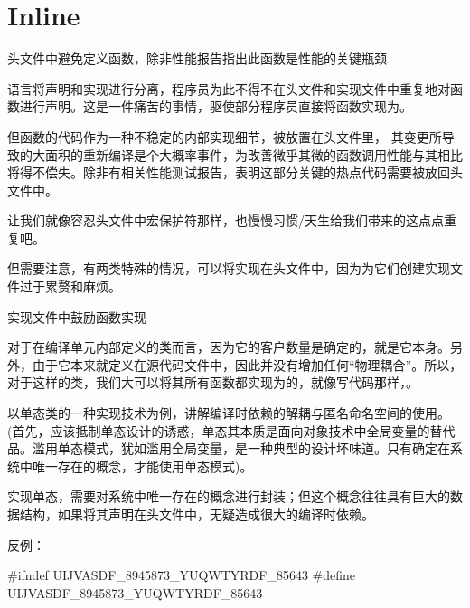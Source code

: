 \section{Inline}

\begin{content}

\begin{regulation}
头文件中避免定义函数，除非性能报告指出此函数是性能的关键瓶颈
\end{regulation}

\cpp{}语言将声明和实现进行分离，程序员为此不得不在头文件和实现文件中重复地对函数进行声明。这是一件痛苦的事情，驱使部分程序员直接将函数实现为。

但函数的代码作为一种不稳定的内部实现细节，被放置在头文件里，
其变更所导致的大面积的重新编译是个大概率事件，为改善微乎其微的函数调用性能与其相比将得不偿失。除非有相关性能测试报告，表明这部分关键的热点代码需要被放回头文件中。

让我们就像容忍头文件中宏保护符那样，也慢慢习惯\clang{}/\cpp{}天生给我们带来的这点点重复吧。

但需要注意，有两类特殊的情况，可以将实现在头文件中，因为为它们创建实现文件过于累赘和麻烦。

\begin{enum}
\end{enum}

\begin{regulation}
实现文件中鼓励函数实现
\end{regulation}

对于在编译单元内部定义的类而言，因为它的客户数量是确定的，就是它本身。另外，由于它本来就定义在源代码文件中，因此并没有增加任何“物理耦合”。所以，对于这样的类，我们大可以将其所有函数都实现为的，就像写代码那样，。

以单态类的一种实现技术为例，讲解编译时依赖的解耦与匿名命名空间的使用。(首先，应该抵制单态设计的诱惑，单态其本质是面向对象技术中全局变量的替代品。滥用单态模式，犹如滥用全局变量，是一种典型的设计坏味道。只有确定在系统中唯一存在的概念，才能使用单态模式)。

实现单态，需要对系统中唯一存在的概念进行封装；但这个概念往往具有巨大的数据结构，如果将其声明在头文件中，无疑造成很大的编译时依赖。

反例：
\begin{leftbar}
\begin{c++}[caption={\ttfamily{ne/NetworkElementRepository.h}}]
#ifndef UIJVASDF_8945873_YUQWTYRDF_85643
#define UIJVASDF_8945873_YUQWTYRDF_85643    


\end{c++}
\end{leftbar}
\end{content}
